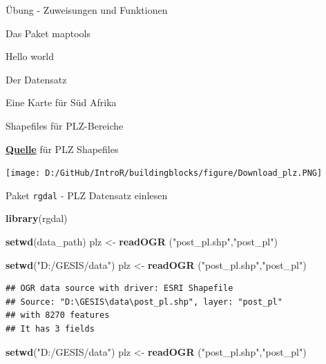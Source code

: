 \documentclass[ignorenonframetext,]{beamer}
\newenvironment{Shaded}{\begin{snugshade}}{\end{snugshade}}
\newcommand{\KeywordTok}[1]{\textcolor[rgb]{0.26,0.66,0.93}{\textbf{#1}}}
\newcommand{\NormalTok}[1]{\textcolor[rgb]{0.74,0.68,0.62}{#1}}
\newcommand{\StringTok}[1]{\textcolor[rgb]{0.02,0.61,0.04}{#1}}
\begin{document}
\begin{frame}[fragile]{Übung - Zuweisungen und Funktionen}
\begin{frame}[fragile]{Das Paket maptools}
\begin{frame}[fragile]{Hello world}
\begin{frame}[fragile]{Der Datensatz}
\begin{frame}[fragile]{Eine Karte für Süd Afrika}
\begin{frame}{Shapefiles für PLZ-Bereiche}
\begin{block}{\href{http://arnulf.us/PLZ}{\textbf{Quelle}} für PLZ
Shapefiles}

\texttt{[image: D:/GitHub/IntroR/buildingblocks/figure/Download\_plz.PNG]}

\end{block}

\end{frame}

\begin{frame}[fragile]{Paket \texttt{rgdal} - PLZ Datensatz einlesen}
\protect\hypertarget{paket-rgdal---plz-datensatz-einlesen}{}

\begin{Shaded}
\begin{Highlighting}[]
\KeywordTok{library}\NormalTok{(rgdal)}
\end{Highlighting}
\end{Shaded}

\begin{Shaded}
\begin{Highlighting}[]
\KeywordTok{setwd}\NormalTok{(data_path)}
\NormalTok{plz <-}\StringTok{ }\KeywordTok{readOGR}\NormalTok{ (}\StringTok{"post_pl.shp"}\NormalTok{,}\StringTok{"post_pl"}\NormalTok{)}
\end{Highlighting}
\end{Shaded}

\begin{Shaded}
\begin{Highlighting}[]
\KeywordTok{setwd}\NormalTok{(}\StringTok{"D:/GESIS/data"}\NormalTok{)}
\NormalTok{plz <-}\StringTok{ }\KeywordTok{readOGR}\NormalTok{ (}\StringTok{"post_pl.shp"}\NormalTok{,}\StringTok{"post_pl"}\NormalTok{)}
\end{Highlighting}
\end{Shaded}

\begin{verbatim}
## OGR data source with driver: ESRI Shapefile 
## Source: "D:\GESIS\data\post_pl.shp", layer: "post_pl"
## with 8270 features
## It has 3 fields
\end{verbatim}

\begin{Shaded}
\begin{Highlighting}[]
\KeywordTok{setwd}\NormalTok{(}\StringTok{"D:/GESIS/data"}\NormalTok{)}
\NormalTok{plz <-}\StringTok{ }\KeywordTok{readOGR}\NormalTok{ (}\StringTok{"post_pl.shp"}\NormalTok{,}\StringTok{"post_pl"}\NormalTok{)}
\end{Highlighting}
\end{Shaded}


\end{frame}
\end{frame}
\end{frame}
\end{frame}
\end{frame}
\end{frame}
\end{document}
